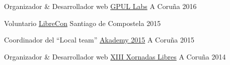 


\begin{cvhonors}


\cvhonor
{Organizador \& Desarrollador web} %
{\href{http://labs.gpul.org/}{GPUL Labs}} %
{A Coruña} %
{2016} %
    

\cvhonor
{Voluntario} %
{\href{http://www.librecon.io/}{LibreCon}} %
{Santiago de Compostela} %
{2015} %


\cvhonor
{Coordinador del ``Local team''} %
{\href{https://akademy.kde.org/2015}{Akademy 2015}} %
{A Coruña} %
{2015} %


\cvhonor
{Organizador \& Desarrollador web} %
{\href{http://gpul.es/e/2014/xornadas-libres/}{XIII Xornadas Libres}} %
{A Coruña} %
{2014} %



\end{cvhonors}